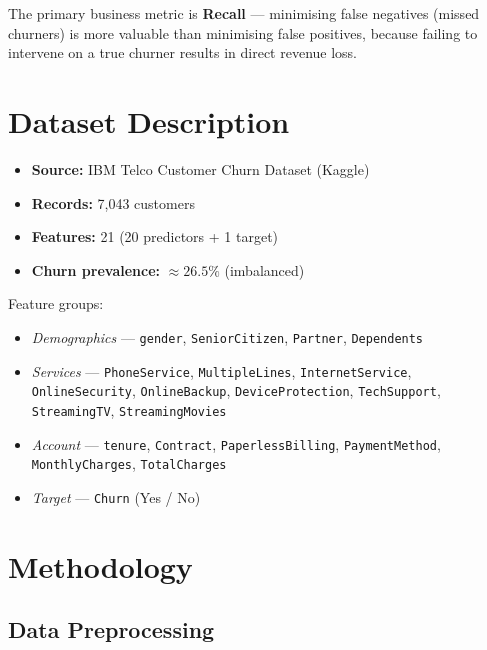 \documentclass[12pt]{article}
\begin{document}
The primary business metric is \textbf{Recall} — minimising false negatives
(missed churners) is more valuable than minimising false positives, because
failing to intervene on a true churner results in direct revenue loss.

\section{Dataset Description}

\begin{itemize}
  \item \textbf{Source:} IBM Telco Customer Churn Dataset (Kaggle)
  \item \textbf{Records:} 7,043 customers
  \item \textbf{Features:} 21 (20 predictors + 1 target)
  \item \textbf{Churn prevalence:} $\approx 26.5\%$ (imbalanced)
\end{itemize}

\noindent Feature groups:
\begin{itemize}
  \item \textit{Demographics} — \texttt{gender}, \texttt{SeniorCitizen},
        \texttt{Partner}, \texttt{Dependents}
  \item \textit{Services} — \texttt{PhoneService}, \texttt{MultipleLines},
        \texttt{InternetService}, \texttt{OnlineSecurity},
        \texttt{OnlineBackup}, \texttt{DeviceProtection},
        \texttt{TechSupport}, \texttt{StreamingTV},
        \texttt{StreamingMovies}
  \item \textit{Account} — \texttt{tenure}, \texttt{Contract},
        \texttt{PaperlessBilling}, \texttt{PaymentMethod},
        \texttt{MonthlyCharges}, \texttt{TotalCharges}
  \item \textit{Target} — \texttt{Churn} (Yes / No)
\end{itemize}

\section{Methodology}

\subsection{Data Preprocessing}
\end{document}
